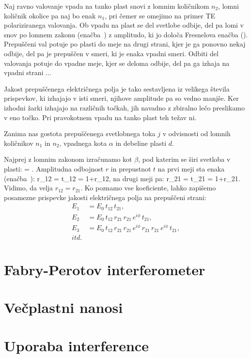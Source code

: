 Naj ravno valovanje vpada na tanko plast snovi z lomnim količnikom $n_2$, lomni količnik 
okolice pa naj bo enak $n_1$, pri čemer se omejimo na primer TE polariziranega valovanja.
Ob vpadu na plast se del svetlobe odbije, del pa lomi v snov po lomnem zakonu (enačba~) 
z amplitudo, ki jo določa Fresnelova enačba (). Prepuščeni val potuje po plasti do meje
na drugi strani, kjer je ga ponovno nekaj odbije, del pa je prepuščen v smeri, ki 
je enaka vpadni smeri. Odbiti del valovanja potuje 
do vpadne meje, kjer se deloma odbije, del pa ga izhaja na vpadni strani ... 

Jakost prepuščenega električnega polja je tako sestavljena iz velikega števila prispevkov, ki 
izhajajo v isti smeri, njihove amplitude pa so vedno manjše. Ker izhodni žarki 
izhajajo na različnih točkah, jih navadno z zbiralno lečo preslikamo v eno točko. Pri pravokotnem
vpadu na tanko plast teh težav ni. 

Zanima nas gostota prepuščenega svetlobnega toka $j$ v odvisnosti od 
lomnih količnikov $n_1$ in $n_2$, vpadnega kota $\alpha$ in debeline plasti $d$. 

Najprej z lomnim zakonom izračunamo kot $\beta$, pod katerim se širi svetloba v plasti:
\beq
\sin\beta = \sin\alpha.
\label{eq:06_25}
\eeq
Amplitudna odbojnost $r$ in prepustnot $t$ na prvi meji sta enaka (enačba~):
\beq
r_{12} = \qquad 
{}\qquad t_{12} = 1+r_{12},
\label{eq:06_26}
\eeq
na drugi meji pa:
\beq
r_{21} = \qquad 
{}\qquad t_{21} = 1+r_{21}.
\label{eq:06_27}
\eeq
Vidimo, da velja $r_{12} = r_{21}$. Ko poznamo vse koeficiente, lahko zapišemo
posamezne prispevke jakosti električnega polja na prepuščeni strani:
\begin{align}
E_1 &= E_0\,t_{12}\,t_{21},\\
E_2 &= E_0\,t_{12}\,r_{21}\,r_{21}\,e^{i\phi}\,t_{21},\\
E_3 &= E_0\,t_{12}\,r_{21}\,r_{21}\,e^{i\phi}\,r_{21}\,r_{21}\,e^{i\phi}\,t_{21},\\
itd.
\label{eq:06_29}
\end{align}





\section{Fabry-Perotov interferometer}
\section{Večplastni nanosi}
\section{Uporaba interference}
